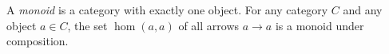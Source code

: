 A \emph{monoid} is a category with exactly one object. For any category $C$ and any object $a \in C$, the set $\hom(a, a)$ of all arrows $a \to a$ is a monoid under composition.
